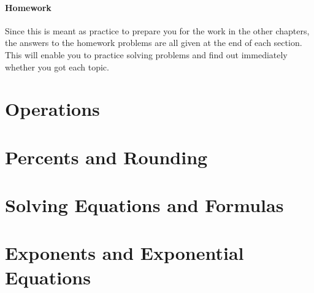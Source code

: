\documentclass[9pt,letter,twoside,openright]{memoir}
\begin{document}
\paragraph{Homework} Since this is meant as practice to prepare you for the work in the other chapters, the answers to the homework problems are all given at the end of each section.  This will enable you to practice solving problems and find out immediately whether you got each topic.

\vfill
\pagebreak

\section{Operations}


\section{Percents and Rounding}


\section{Solving Equations and Formulas}


\section{Exponents and Exponential Equations}


\renewcommand{\thechapter}{\arabic{chapter}}%
\end{document}
